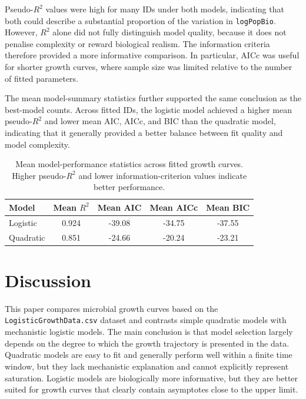 \documentclass{article}
\begin{document}
Pseudo-\(R^2\) values were high for many IDs under both models, indicating that both could describe a substantial proportion of the variation in \texttt{logPopBio}. However, \(R^2\) alone did not fully distinguish model quality, because it does not penalise complexity or reward biological realism. The information criteria therefore provided a more informative comparison. In particular, AICc was useful for shorter growth curves, where sample size was limited relative to the number of fitted parameters.

The mean model-summary statistics further supported the same conclusion as the best-model counts. Across fitted IDs, the logistic model achieved a higher mean pseudo-\(R^2\) and lower mean AIC, AICc, and BIC than the quadratic model, indicating that it generally provided a better balance between fit quality and model complexity.

\begin{table}[H]
\centering
\caption{Mean model-performance statistics across fitted growth curves. Higher pseudo-\(R^2\) and lower information-criterion values indicate better performance.}
\label{tab:placeholder}
\begin{tabular}{lcccc}
\toprule
Model & Mean \(R^2\) & Mean AIC & Mean AICc & Mean BIC \\
\midrule
Logistic  & 0.924 & -39.08 & -34.75 & -37.55 \\
Quadratic & 0.851 & -24.66 & -20.24 & -23.21 \\
\bottomrule
\end{tabular}
\end{table}
\section{Discussion}

This paper compares microbial growth curves based on the \texttt{LogisticGrowthData.csv} dataset and contrasts simple quadratic models with mechanistic logistic models. The main conclusion is that model selection largely depends on the degree to which the growth trajectory is presented in the data. Quadratic models are easy to fit and generally perform well within a finite time window, but they lack mechanistic explanation and cannot explicitly represent saturation. Logistic models are biologically more informative, but they are better suited for growth curves that clearly contain asymptotes close to the upper limit.
\end{document}
